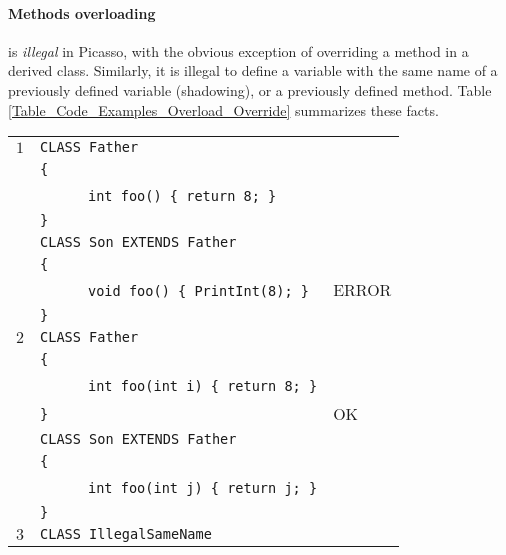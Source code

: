 \documentclass{article}
\begin{document}
\paragraph{Methods overloading} is \textit{illegal} in Picasso,
with the obvious exception of overriding a method in a derived class.
Similarly, it is illegal to define a variable with the same name of
a previously defined variable (shadowing), or a previously defined method.
Table \ref{Table_Code_Examples_Overload_Override} summarizes these facts.
\begin{table}[h]
\centering
\begin{tabular}{|l|l|l|}
\hline
 $1$ & \verb"CLASS Father"                       &       \\
     & \verb"{"                                  &       \\
     & ~ ~ ~ ~\verb"int foo() { return 8; }"     &       \\
     & \verb"}"                                  &       \\
     & \verb"CLASS Son EXTENDS Father"           &       \\
     & \verb"{"                                  &       \\
     & ~ ~ ~ ~\verb"void foo() { PrintInt(8); }" & ERROR \\
     & \verb"}"                                  &       \\
\hline
 $2$ & \verb"CLASS Father"                        &    \\
     & \verb"{"                                   &    \\
     & ~ ~ ~ ~\verb"int foo(int i) { return 8; }" &    \\
     & \verb"}"                                   & OK \\
     & \verb"CLASS Son EXTENDS Father"            &    \\
     & \verb"{"                                   &    \\
     & ~ ~ ~ ~\verb"int foo(int j) { return j; }" &    \\
     & \verb"}"                                   &    \\
\hline
 $3$ & \verb"CLASS IllegalSameName"                   &       \\

\end{tabular}
\end{table}
\end{document}
